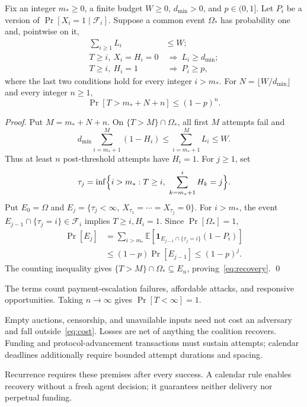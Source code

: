 \documentclass[runningheads,orivec]{llncs}
\begin{document}
\begin{theorem}[Recovery]\label{thm:recovery}
Fix an integer $m_*\geq0$, a finite budget $W\geq0$, $d_{\min}>0$, and $p\in(0,1]$. Let $P_i$ be a version of $\Pr[X_i=1\mid\mathcal F_i]$. Suppose a common event $\Omega_*$ has probability one and, pointwise on it,
\begin{align}
 \sum_{i\geq1}L_i&\leq W;\label{eq:budget}\\
 T\geq i,\ X_i=H_i=0&\ \Longrightarrow\ L_i\geq d_{\min};\label{eq:cost}\\
 T\geq i,\ H_i=1&\ \Longrightarrow\ P_i\geq p,\label{eq:success}
\end{align}
where the last two conditions hold for every integer $i>m_*$. For $N=\lfloor W/d_{\min}\rfloor$ and every integer $n\geq1$,
\begin{equation}\label{eq:recovery}
 \Pr[T>m_*+N+n]\leq(1-p)^n.
\end{equation}
\end{theorem}
\begin{proof}
Put $M=m_*+N+n$. On $\{T>M\}\cap\Omega_*$, all first $M$ attempts fail and
\[
 d_{\min}\sum_{i=m_*+1}^{M}(1-H_i)\leq\sum_{i=m_*+1}^{M}L_i\leq W.
\]
Thus at least $n$ post-threshold attempts have $H_i=1$. For $j\geq1$, set
\[
 \tau_j=\inf\Bigl\{i>m_*:T\geq i,\ \sum_{k=m_*+1}^i H_k=j\Bigr\}.
\]
Put $E_0=\Omega$ and $E_j=\{\tau_j<\infty,\ X_{\tau_1}=\cdots=X_{\tau_j}=0\}$. For $i>m_*$, the event $E_{j-1}\cap\{\tau_j=i\}\in\mathcal F_i$ implies $T\geq i,H_i=1$. Since $\Pr[\Omega_*]=1$,
\begin{align*}
 \Pr[E_j]
 &=\sum_{i>m_*}\mathbb E[\mathbf1_{E_{j-1}\cap\{\tau_j=i\}}(1-P_i)]\\
 &\leq(1-p)\Pr[E_{j-1}]\leq(1-p)^j.
\end{align*}
The counting inequality gives $\{T>M\}\cap\Omega_*\subseteq E_n$, proving~\eqref{eq:recovery}. \qed
\end{proof}
The terms count payment-escalation failures, affordable attacks, and responsive opportunities. Taking $n\to\infty$ gives $\Pr[T<\infty]=1$.

Empty auctions, censorship, and unavailable inputs need not cost an adversary and fall outside~\eqref{eq:cost}. Losses are net of anything the coalition recovers. Funding and protocol-advancement transactions must sustain attempts; calendar deadlines additionally require bounded attempt durations and spacing.

Recurrence requires these premises after every success. A calendar rule enables recovery without a fresh agent decision; it guarantees neither delivery nor perpetual funding.
\end{document}
